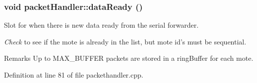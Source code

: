 \hypertarget{classpacketHandler_a9085a61a51eccc7acb240a7b68601686}{
\subsubsection[{dataReady}]{\setlength{\rightskip}{0pt plus 5cm}void packetHandler::dataReady ()}}
\label{classpacketHandler_a9085a61a51eccc7acb240a7b68601686}


Slot for when there is new data ready from the serial forwarder. 



{\itshape Check\/} to see if the mote is already in the list, but mote id's must be sequential.

\begin{DoxyRemark}{Remarks}
Up to MAX\_\-BUFFER packets are stored in a ringBuffer for each mote. 
\end{DoxyRemark}




Definition at line 81 of file packethandler.cpp.




